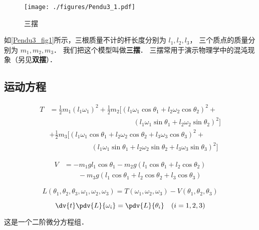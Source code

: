 
\begin{figure}[ht]
\centering
\texttt{[image: ./figures/Pendu3\_1.pdf]}
\caption{三摆} \label{Pendu3_fig1}
\end{figure}
如\autoref{Pendu3_fig1}所示，三根质量不计的杆长度分别为 $l_1, l_2, l_3$， 三个质点的质量分别为 $m_1, m_2, m_3$． 我们把这个模型叫做\textbf{三摆}． 三摆常用于演示物理学中的混沌现象（另见\textbf{双摆}）．%
 
\subsection{运动方程}

\begin{equation}
\begin{aligned}
T &= \frac{1}{2} m_1 (l_1 \omega_1)^2 + \frac{1}{2} m_2 [(l_1 \omega_1 \cos\theta_1 + l_2 \omega_2 \cos\theta_2)^2 +\\
&\qquad \qquad\qquad\qquad\qquad\qquad (l_1 \omega_1 \sin\theta_1 + l_2 \omega_2 \sin\theta_2)^2]\\
& + \frac{1}{2} m_3 [(l_1 \omega_1 \cos\theta_1 + l_2 \omega_2 \cos\theta_2 + l_3 \omega_3 \cos \theta_3)^2 +\\
&\qquad\qquad\qquad (l_1 \omega_1 \sin\theta_1 + l_2 \omega_2 \sin\theta_2 + l_3 \omega_3 \sin\theta_3)^2]
\end{aligned}
\end{equation}

\begin{equation} 
\begin{aligned} 
V &= -m_1 g l_1 \cos \theta_1 - m_2 g (l_1\cos \theta_1 + l_2 \cos \theta_2)\\
&\qquad - m_3 g (l_1 \cos\theta_1 + l_2 \cos \theta_2 + l_3 \cos \theta_3)
\end{aligned}
\end{equation}

\begin{equation}
L(\theta_1, \theta_2, \theta_3, \omega_1, \omega_2, \omega_3) = T(\omega_1, \omega_2, \omega_3) - V(\theta_1, \theta_2, \theta_3)
\end{equation}

\begin{equation}
\dv{t} \pdv{L}{\omega_i} = \pdv{L}{\theta_i} \quad (i=1,2,3)
\end{equation}

这是一个二阶微分方程组．


